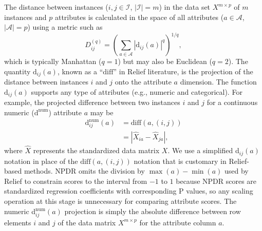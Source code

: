 \documentclass[10pt,letterpaper]{article}
\def\ri{R_i}
\def\rj{R_j}
\begin{document}
The distance between instances ($i,j \in \mathcal{I}$, $|\mathcal{I}|=m$) in the data set $X^{m \times p}$ of $m$ instances and $p$ attributes is calculated in the space of all attributes ($a \in \mathcal{A}$, $|\mathcal{A}|=p$) using a metric such as
\begin{equation}\label{eq:D}
D^{(q)}_{ij}=\left(\sum_{a\in \mathcal{A}}|\text{d}_{ij}(a)|^q\right)^{1/q},
\end{equation}
%
which is typically Manhattan ($q=1$) but may also be Euclidean ($q=2$). The quantity 
$\text{d}_{ij}(a)$,
known as a ``$\text{diff}$'' in Relief literature, is the projection of the distance between instances $i$ and $j$ onto the attribute $a$ dimension. The 
function $\text{d}_{ij}(a)$ supports any type of attributes
(e.g., numeric and categorical).
For example, the projected difference between two instances $i$ and $j$ for a continuous numeric ($\text{d}^{\text{num}}$) attribute $a$ may be
\begin{equation}\label{eq:diff}
\begin{aligned}
\text{d}^{\text{num}}_{ij}(a)&=\text{diff}(a,(i,j))\\
                                            & = {|\hat{X}_{ia}-\hat{X}_{ja}|},
\end{aligned}
\end{equation}
where $\hat{X}$ represents the standardized data matrix $X$.
We use a simplified d$_{ij}(a)$ notation in place of the $\text{diff}(a,(i,j))$ notation that is customary in Relief-based methods.
NPDR omits the division by $\max(a)-\min(a)$ used by Relief to constrain scores to the interval from $-1$ to $1$ because NPDR scores are standardized regression coefficients with corresponding P values, so any scaling operation at this stage is unnecessary for comparing attribute scores. 
The numeric d$^{\text{num}}_{ij}(a)$ projection is simply the absolute difference between row elements $i$ and $j$ of the data matrix $X^{m \times p}$ for the attribute column $a$. 
\end{document}
